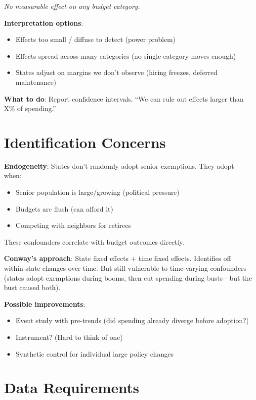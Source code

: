 \documentclass[11pt]{article}
\begin{document}
\textit{No measurable effect on any budget category.}

\textbf{Interpretation options}:
\begin{itemize}
    \item Effects too small / diffuse to detect (power problem)
    \item Effects spread across many categories (no single category moves enough)
    \item States adjust on margins we don't observe (hiring freezes, deferred maintenance)
\end{itemize}

\textbf{What to do}: Report confidence intervals. ``We can rule out effects larger than X\% of spending.''

\section{Identification Concerns}

\textbf{Endogeneity}: States don't randomly adopt senior exemptions. They adopt when:
\begin{itemize}
    \item Senior population is large/growing (political pressure)
    \item Budgets are flush (can afford it)
    \item Competing with neighbors for retirees
\end{itemize}

These confounders correlate with budget outcomes directly.

\textbf{Conway's approach}: State fixed effects + time fixed effects. Identifies off within-state changes over time. But still vulnerable to time-varying confounders (states adopt exemptions during booms, then cut spending during busts---but the bust caused both).

\textbf{Possible improvements}:
\begin{itemize}
    \item Event study with pre-trends (did spending already diverge before adoption?)
    \item Instrument? (Hard to think of one)
    \item Synthetic control for individual large policy changes
\end{itemize}

\section{Data Requirements}
\end{document}
